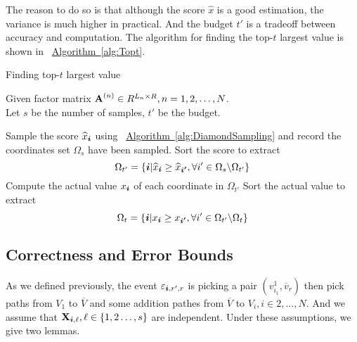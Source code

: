 \documentclass{article}
\newcommand{\V}[1]{{\bm{{\MakeLowercase{#1}}}}}
\newcommand{\M}[1]{{\bm{\mathbf{\MakeUppercase{#1}}}}}
\newcommand{\Alg}[1] {\hyperref[alg:#1] {Algorithm~\ref*{alg:#1}}}
\begin{document}
The reason to do so is that although the score $\widehat{x}$ is a good estimation, the variance is much higher in practical. And the budget $t'$ is a tradeoff between accuracy and computation. The algorithm for finding the top-$t$ largest value is shown in ~\Alg{Topt}.
\begin{algorithm}[t]
    \caption{Finding top-$t$ largest value}
    \label{alg:Topt}
    Given factor matrix $\M{A}^{(n)}\in R^{L_n\times R}, n = 1,2,\ldots,N$.\\
    Let $s$ be the number of samples, $t'$ be the budget.
    \begin{algorithmic}[1]
    \State Sample the score $\widehat{x}_\V{i}$ using ~\Alg{DiamondSampling} and record the coordinates set $\Omega_s$ have been sampled.
    \State Sort the score to extract
    \[
        \Omega_{t'} = \{\V{i}|\widehat{x}_{\V{i}}\geq \widehat{x}_{\V{i'}},\forall i'\in \Omega_{s} \backslash \Omega_{t'}\}
    \]
    \State Compute the actual value $x_{\V{i}}$ of each coordinate in $\Omega_{t'}$
    \State Sort the actual value to extract
    \[
        \Omega_{t}=\{\V{i}|x_{\V{i}}\geq x_{\V{i'}},\forall i' \in \Omega_{t'} \backslash \Omega_{t} \}
    \]
    \end{algorithmic}
\end{algorithm}

\subsection{Correctness and Error Bounds}

As we defined previously, the event $\varepsilon_{\V{i},r',r}$ is picking a pair $(v^1_{i_1},\overline{v}_r)$ then pick paths from $V_1$ to $\overline{V}$ and some addition pathes from $\overline{V}$ to $V_i,i\in{2,\ldots,N}$. And we assume that $\M{X}_{\V{i},\ell},\ell\in\{1,2\ldots,s\}$ are independent. Under these assumptions, we give two lemmas.
\end{document}

